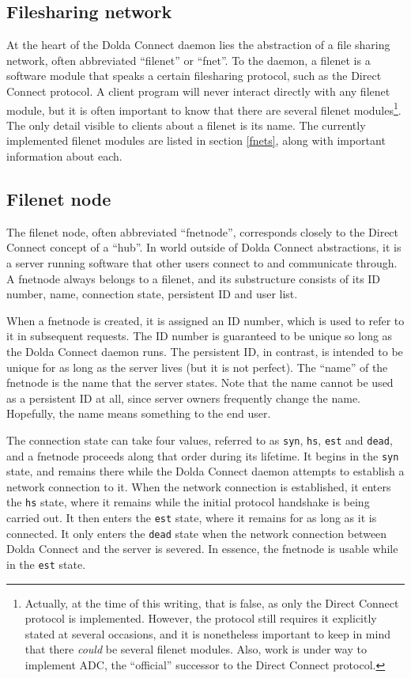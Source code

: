 \documentclass[twoside,a4paper,11pt]{article}
\begin{document}
\subsection{Filesharing network}
\label{fnet}
At the heart of the Dolda Connect daemon lies the abstraction of a
file sharing network, often abbreviated ``filenet'' or ``fnet''. To
the daemon, a filenet is a software module that speaks a certain
filesharing protocol, such as the Direct Connect protocol. A client
program will never interact directly with any filenet module, but it
is often important to know that there are several filenet
modules\footnote{Actually, at the time of this writing, that is false,
  as only the Direct Connect protocol is implemented. However, the
  protocol still requires it explicitly stated at several occasions,
  and it is nonetheless important to keep in mind that there
  \emph{could} be several filenet modules. Also, work is under way to
  implement ADC, the ``official'' successor to the Direct Connect
  protocol.}. The only detail visible to clients about a filenet is
its name. The currently implemented filenet modules are listed in
section \ref{fnets}, along with important information about each.

\subsection{Filenet node}
\label{fnetnode}
The filenet node, often abbreviated ``fnetnode'', corresponds closely
to the Direct Connect concept of a ``hub''. In world outside of Dolda
Connect abstractions, it is a server running software that other users
connect to and communicate through. A fnetnode always belongs to a
filenet, and its substructure consists of its ID number, name,
connection state, persistent ID and user list.

When a fnetnode is created, it is assigned an ID number, which is used
to refer to it in subsequent requests. The ID number is guaranteed to
be unique so long as the Dolda Connect daemon runs. The persistent ID,
in contrast, is intended to be unique for as long as the server lives
(but it is not perfect). The ``name'' of the fnetnode is the name that
the server states. Note that the name cannot be used as a persistent
ID at all, since server owners frequently change the name. Hopefully,
the name means something to the end user.

The connection state can take four values, referred to as
\texttt{syn}, \texttt{hs}, \texttt{est} and \texttt{dead}, and a
fnetnode proceeds along that order during its lifetime. It begins in
the \texttt{syn} state, and remains there while the Dolda Connect
daemon attempts to establish a network connection to it. When the
network connection is established, it enters the \texttt{hs} state,
where it remains while the initial protocol handshake is being carried
out. It then enters the \texttt{est} state, where it remains for as
long as it is connected. It only enters the \texttt{dead} state when
the network connection between Dolda Connect and the server is
severed. In essence, the fnetnode is usable while in the \texttt{est}
state.
\end{document}
